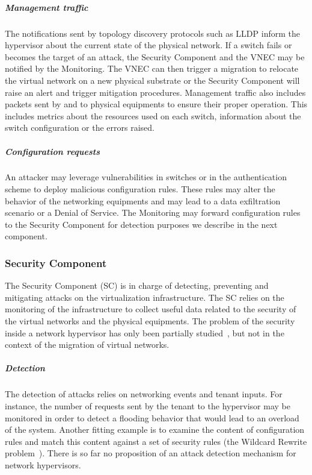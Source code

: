 \subparagraph{Management traffic} 
The notifications sent by topology discovery protocols such as LLDP inform the hypervisor about the current state of the physical network. If a switch fails or becomes the target of an attack, the Security Component and the VNEC may be notified by the Monitoring.
The VNEC can then trigger a migration to relocate the virtual network on a new physical substrate or the Security Component will raise an alert and trigger mitigation procedures.
Management traffic also includes packets sent by and to physical equipments to ensure their proper operation.
This includes metrics about the resources used on each switch, information about the switch configuration or the errors raised.

\subparagraph{Configuration requests} An attacker may leverage vulnerabilities in switches or in the authentication scheme to deploy malicious configuration rules. These rules may alter the behavior of the networking equipments and may lead to a data exfiltration scenario or a Denial of Service.
The Monitoring may forward configuration rules to the Security Component for detection purposes we describe in the next component.

\subsubsection{Security Component}
The Security Component (SC) is in charge of detecting, preventing and mitigating attacks on the virtualization infrastructure. The SC relies on the monitoring of the infrastructure to collect useful data related to the security of the virtual networks and the physical equipments.
The problem of the security inside a network hypervisor has only been partially studied~\cite{Costa2015}, but not in the context of the migration of virtual networks.

\subparagraph{Detection}
The detection of attacks relies on networking events and tenant inputs.
For instance, the number of requests sent by the tenant to the hypervisor may be monitored in order to detect a flooding behavior that would lead to an overload of the system. Another fitting example is to examine the content of configuration rules and match this content against a set of security rules (\eg the Wildcard Rewrite problem~\cite{Costa2015}).
There is so far no proposition of an attack detection mechanism for network hypervisors.

